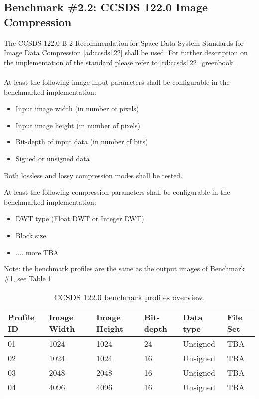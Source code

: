 \newpage
\subsection{Benchmark \#2.2: CCSDS 122.0 Image Compression}
The CCSDS 122.0-B-2 Recommendation for Space Data System Standards for Image Data Compression \ref{ad:ccsds122} shall be used. For further description on the implementation of the standard please refer to \ref{rd:ccsds122_greenbook}.
\\
\\
At least the following image input parameters shall be configurable in the benchmarked implementation:
\begin{itemize}
    \item Input image width (in number of pixels)
    \item Input image height (in number of pixels)
    \item Bit-depth of input data (in number of bits)
    \item Signed or unsigned data
\end{itemize}

Both lossless and lossy compression modes shall be tested.

At least the following compression parameters shall be configurable in the benchmarked implementation: 
\begin{itemize}
    \item DWT type (Float DWT or Integer DWT)
    \item Block size
    \item .... more TBA %
\end{itemize}

Note: the benchmark profiles are the same as the output images of Benchmark \#1, see Table \ref{tab:ccsds122_profiles}

\begin{table}[!h]
\centering
\begin{tabular}{|l|l|l|l|l|l|}
    \hline
    Profile ID  & Image Width     & Image Height    & Bit-depth	 & Data type       & File Set      \\ \hline 
    \hline
    01	        & 1024	          & 1024	        & 24         & Unsigned        & TBA           \\ \hline
    02	        & 1024	          & 1024	        & 16         & Unsigned        & TBA           \\ \hline
    03	        & 2048	          & 2048	        & 16         & Unsigned        & TBA           \\ \hline
    04	        & 4096	          & 4096	        & 16         & Unsigned        & TBA           \\ \hline
\end{tabular}
\caption{CCSDS 122.0 benchmark profiles overview.}
\label{tab:ccsds122_profiles}
\end{table}

